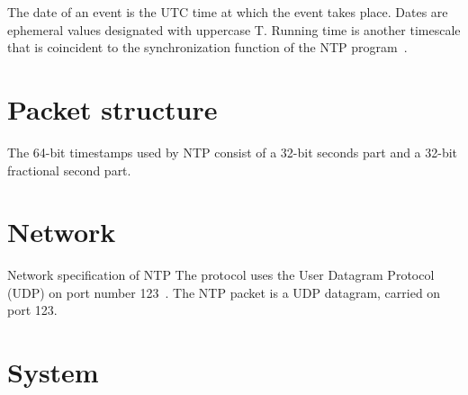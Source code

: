    The date of an event is the UTC time at which the event takes place.
   Dates are ephemeral values designated with uppercase T.  Running time
   is another timescale that is coincident to the synchronization
   function of the NTP program~\cite{rfc5905}.



\section{Packet structure}
The 64-bit timestamps used by NTP consist of a 32-bit seconds part and a 32-bit fractional second part.

\section{Network}\label{sec:ntp-network}
Network specification of NTP 
The protocol uses the User Datagram Protocol (UDP) on port number 123~\cite{ianna-ports}.
The NTP packet is a UDP datagram, carried on port 123.

\section{System}
